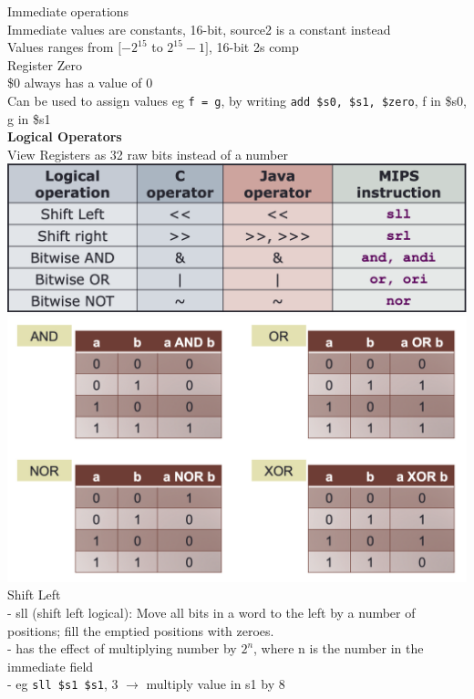 \documentclass[10pt, a4paper]{article}
\begin{document}
\begin{multicols*}{3}
		Immediate operations\\
		Immediate values are constants, 16-bit, source2 is a constant instead\\
		Values ranges from $[-2^{15}$ to $2^{15}-1]$, 16-bit 2s comp\\
		
		Register Zero\\
		\$0 always has a value of 0\\
		Can be used to assign values eg \texttt{f = g}, by writing \texttt{add \$s0, \$s1, \$zero}, f in \$s0, g in \$s1\\
		
		\textbf{Logical Operators}\\
		View Registers as 32 raw bits instead of a number\\
		\includegraphics[scale=0.25]{./assets/logicalOperators}\\
		\includegraphics[scale=.25]{./assets/truthTables}\\
		
		Shift Left\\
		- sll (shift left logical): Move all bits in a word to the left by a number of positions; fill the emptied positions with zeroes.\\
		- has the effect of multiplying number by $2^n$, where n is the number in the immediate field\\
		- eg \texttt{sll \$s1 \$s1}, 3 $\rightarrow$ multiply value in s1 by 8\\
		

\end{multicols*}
\end{document}
